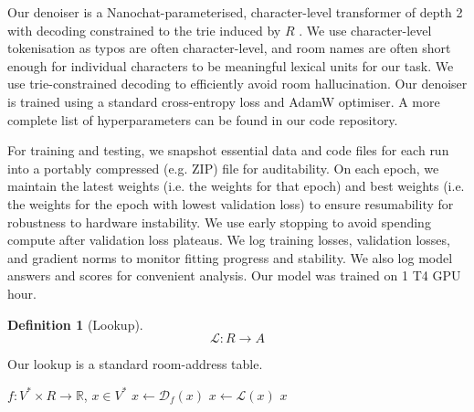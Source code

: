 \documentclass{article}
\theoremstyle{definition}
\newtheorem{definition}{Definition}
\newcommand{\R}{\mathbb{R}}
\begin{document}
Our denoiser is a Nanochat-parameterised, character-level transformer of depth 2 with decoding constrained to the trie induced by $R$
\citep{nanochat}.
We use character-level tokenisation as typos are often character-level, and room names are often short enough for individual characters to be meaningful lexical units for our task.
We use trie-constrained decoding to efficiently avoid room hallucination.
Our denoiser is trained using a standard cross-entropy loss and AdamW optimiser.
A more complete list of hyperparameters can be found in our code repository.

For training and testing, we snapshot essential data and code files for each run into a portably compressed (e.g. ZIP) file for auditability.
On each epoch, we maintain the latest weights (i.e. the weights for that epoch) and best weights (i.e. the weights for the epoch with lowest validation loss) to ensure resumability for robustness to hardware instability.
We use early stopping to avoid spending compute after validation loss plateaus.
We log training losses, validation losses, and gradient norms to monitor fitting progress and stability.
We also log model answers and scores for convenient analysis.
Our model was trained on 1 T4 GPU hour.

\begin{definition}[Lookup]
$$
	\mathscr{L}:R\to A
$$
\end{definition}

Our lookup is a standard room-address table.



\begin{algorithm}[H]
	\caption{$\textsc{Infer}(f,x)$}
	\begin{algorithmic}
		\Require $f:V^{*}\times R\to\R$, $x\in V^{*}$
			$x\gets\mathscr{D}_{f}(x)$
		\EndIf
		\State $x\gets\mathscr{L}(x)$
		\State \Return $x$
	\end{algorithmic}
\end{algorithm}
\end{document}

